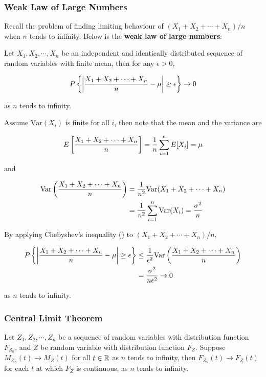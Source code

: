 \documentclass[a4paper,12pt]{article}
\begin{document}
\subsubsection{Weak Law of Large Numbers}
Recall the problem of finding limiting behaviour of $(X_{1}+X_{2}+\cdots+X_{n})/n$ when $n$ tends to infinity. Below is the \textbf{weak law of large numbers}:\n

\begin{thm}
  Let $X_{1},X_{2},\cdots,X_{n}$ be an independent and identically distributed sequence of random variables with finite mean, then for any $\epsilon>0$,

  $$P\left\{ \left| \frac{X_{1}+X_{2}+\cdots+X_{n}}{n}-\mu\right|\geq\epsilon\right\}\to 0$$\s

  as $n$ tends to infinity.\n

  \prf Assume $\mathrm{Var}(X_{i})$ is finite for all $i$, then note that the mean and the variance are

  $$E\left[ \frac{X_{1}+X_{2}+\cdots+X_{n}}{n}\right]=\frac{1}{n}\sum_{i=1}^{n}E[X_{i}]=\mu$$\s

  and

  $$\begin{aligned}[t]
    \mathrm{Var}\left( \frac{X_{1}+X_{2}+\cdots+X_{n}}{n}\right)&=\frac{1}{n^{2}}\mathrm{Var}(X_{1}+X_{2}+\cdots+X_{n})\\
    &=\frac{1}{n^{2}}\sum_{i=1}^{n}\mathrm{Var}(X_{i})=\frac{\sigma^{2}}{n}
  \end{aligned}$$\s

  By applying Chebyshev's inequality (\rthm[\sctr{3}]) to $(X_{1}+X_{2}+\cdots+X_{n})/n$,

  $$\begin{aligned}[t]
    P\left\{ \left| \frac{X_{1}+X_{2}+\cdots+X_{n}}{n}-\mu\right|\geq\epsilon\right\}&\leq\frac{1}{\epsilon^{2}}\mathrm{Var}\left( \frac{X_{1}+X_{2}+\cdots+X_{n}}{n}\right)\\
    &=\frac{\sigma^{2}}{n\epsilon^{2}}\to 0
  \end{aligned}$$\s

  as $n$ tends to infinity.
\end{thm}

\subsubsection{Central Limit Theorem}
\begin{pst}
  Let $Z_{1},Z_{2},\cdots,Z_{n}$ be a sequence of random variables with distribution function $F_{Z_{n}}$, and $Z$ be random variable with distribution function $F_{Z}$. Suppose $M_{Z_{n}}(t)\to M_{Z}(t)$ for all $t\in\mathbb{R}$ as $n$ tends to infinity, then $F_{Z_{n}}(t)\to F_{Z}(t)$ for each $t$ at which $F_{Z}$ is continuous, as $n$ tends to infinity.
\end{pst}\n
\end{document}
